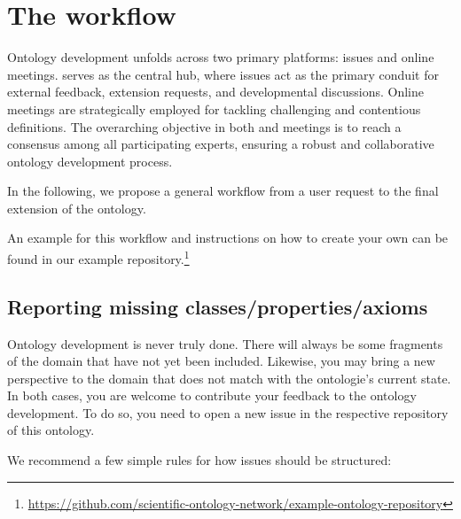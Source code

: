 \section{The {\github} workflow}

Ontology development unfolds across two primary platforms: {\github} issues and online meetings. {\github}  serves as the central hub, where issues act as the primary conduit for external feedback, extension requests, and developmental discussions. Online meetings are strategically employed for tackling challenging and contentious definitions. The overarching objective in both {\github}  and meetings is to reach a consensus among all participating experts, ensuring a robust and collaborative ontology development process.

In the following, we propose a general workflow from a user request to the final extension of the ontology.

An example for this workflow and instructions on how to create your own can be found in our example repository.\footnote{\url{https://github.com/scientific-ontology-network/example-ontology-repository}}

\subsection{Reporting missing classes/properties/axioms}


Ontology development is never truly done. There will always be some fragments of the domain that have not yet been included. Likewise, you may bring a new perspective to the domain that does not match with the ontologie's current state. In both cases, you are welcome to contribute your feedback to the ontology development. To do so, you need to open a new issue in the respective {\github} repository of this ontology. 

We recommend a few simple rules for how issues should be structured:

